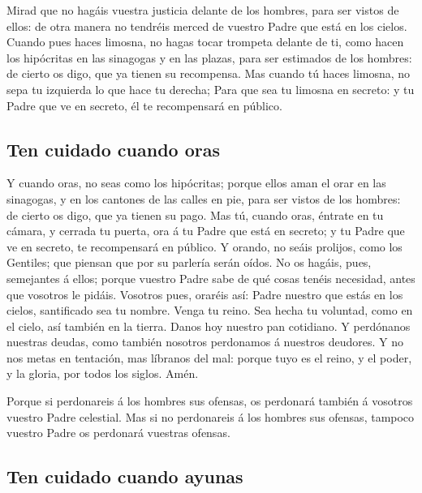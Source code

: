  Mirad que no hagáis vuestra justicia delante de los
hombres, para ser vistos de ellos: de otra manera no tendréis merced de
vuestro Padre que está en los cielos.  Cuando pues haces
limosna, no hagas tocar trompeta delante de ti, como hacen los
hipócritas en las sinagogas y en las plazas, para ser estimados de los
hombres: de cierto os digo, que ya tienen su recompensa. 
Mas cuando tú haces limosna, no sepa tu izquierda lo que hace tu
derecha;  Para que sea tu limosna en secreto: y tu Padre
que ve en secreto, él te recompensará en público.

\hypertarget{ten-cuidado-cuando-oras}{%
\subsection{Ten cuidado cuando oras}\label{ten-cuidado-cuando-oras}}

 Y cuando oras, no seas como los hipócritas; porque ellos
aman el orar en las sinagogas, y en los cantones de las calles en pie,
para ser vistos de los hombres: de cierto os digo, que ya tienen su
pago.  Mas tú, cuando oras, éntrate en tu cámara, y
cerrada tu puerta, ora á tu Padre que está en secreto; y tu Padre que ve
en secreto, te recompensará en público.  Y orando, no
seáis prolijos, como los Gentiles; que piensan que por su parlería serán
oídos.  No os hagáis, pues, semejantes á ellos; porque
vuestro Padre sabe de qué cosas tenéis necesidad, antes que vosotros le
pidáis.  Vosotros pues, oraréis así: Padre nuestro que
estás en los cielos, santificado sea tu nombre.  Venga tu
reino. Sea hecha tu voluntad, como en el cielo, así también en la
tierra.  Danos hoy nuestro pan cotidiano. 
Y perdónanos nuestras deudas, como también nosotros perdonamos á
nuestros deudores.  Y no nos metas en tentación, mas
líbranos del mal: porque tuyo es el reino, y el poder, y la gloria, por
todos los siglos. Amén.

 Porque si perdonareis á los hombres sus ofensas, os
perdonará también á vosotros vuestro Padre celestial. 
Mas si no perdonareis á los hombres sus ofensas, tampoco vuestro Padre
os perdonará vuestras ofensas.

\hypertarget{ten-cuidado-cuando-ayunas}{%
\subsection{Ten cuidado cuando ayunas}\label{ten-cuidado-cuando-ayunas}}

